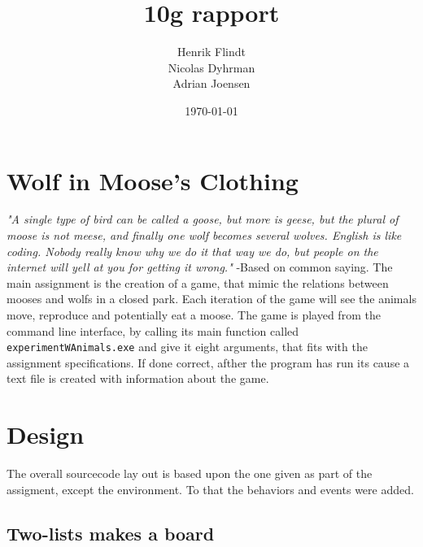 \documentclass{article}
\title{10g rapport}
\author{Henrik Flindt\\Nicolas Dyhrman\\Adrian Joensen}
\date{\today}
\begin{document}
    \maketitle
    
    \section*{Wolf in Moose's Clothing}
    \textit{"A single type of bird can be called a goose, but more is geese, but the plural of moose is not meese, and finally one wolf becomes several wolves. English is like coding. Nobody really know why we do it that way we do, but people on the internet will yell at you for getting it wrong."} \newline -Based on common saying. \newline \newline
    The main assignment is the creation of a game, that mimic the relations between mooses and wolfs in a closed park. Each iteration of the game will see the animals move, reproduce and potentially eat a moose. The game is played from the command line interface, by calling its main function called \verb|experimentWAnimals.exe| and give it eight arguments, that fits with the assignment specifications. If done correct, afther the program has run its cause a text file is created with information about the game. 


    \section{Design}
    	The overall sourcecode lay out is based upon the one given as part of the assigment, except the environment. To that the behaviors and events were added. 
    
   
   
    \subsection{Two-lists makes a board}
\end{document}
